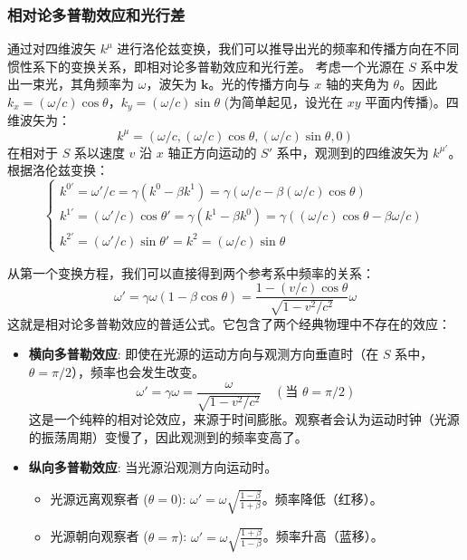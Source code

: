 \documentclass[fontset=none]{ctexart}
\begin{document}
\subsubsection{相对论多普勒效应和光行差}
通过对四维波矢 $k^{\mu}$ 进行洛伦兹变换，我们可以推导出光的频率和传播方向在不同惯性系下的变换关系，即相对论多普勒效应和光行差。
考虑一个光源在 $S$ 系中发出一束光，其角频率为 $\omega$，波矢为 $\bm{k}$。光的传播方向与 $x$ 轴的夹角为 $\theta$。因此 $k_x = (\omega/c)\cos\theta$，$k_y = (\omega/c)\sin\theta$ (为简单起见，设光在 $xy$ 平面内传播)。四维波矢为：
\begin{equation}
k^{\mu} = (\omega/c, (\omega/c)\cos\theta, (\omega/c)\sin\theta, 0)
\end{equation}
在相对于 $S$ 系以速度 $v$ 沿 $x$ 轴正方向运动的 $S'$ 系中，观测到的四维波矢为 $k^{\mu'}$。根据洛伦兹变换：
\begin{equation}
\begin{cases}
k^{0'} = \omega'/c = \gamma(k^0 - \beta k^1) = \gamma(\omega/c - \beta(\omega/c)\cos\theta) \\
k^{1'} = (\omega'/c)\cos\theta' = \gamma(k^1 - \beta k^0) = \gamma((\omega/c)\cos\theta - \beta\omega/c) \\
k^{2'} = (\omega'/c)\sin\theta' = k^2 = (\omega/c)\sin\theta
\end{cases}
\end{equation}

\begin{theorem}[相对论多普勒效应]
从第一个变换方程，我们可以直接得到两个参考系中频率的关系：
\begin{equation}
\omega' = \gamma\omega(1 - \beta\cos\theta) = \frac{1 - (v/c)\cos\theta}{\sqrt{1 - v^2/c^2}}\omega
\end{equation}
这就是相对论多普勒效应的普适公式。它包含了两个经典物理中不存在的效应：
\begin{itemize}
    \item \textbf{横向多普勒效应}: 即使在光源的运动方向与观测方向垂直时（在 $S$ 系中，$\theta=\pi/2$），频率也会发生改变。
    \begin{equation}
    \omega' = \gamma\omega = \frac{\omega}{\sqrt{1 - v^2/c^2}} \quad (\text{当 } \theta = \pi/2)
    \end{equation}
    这是一个纯粹的相对论效应，来源于时间膨胀。观察者会认为运动时钟（光源的振荡周期）变慢了，因此观测到的频率变高了。
    \item \textbf{纵向多普勒效应}: 当光源沿观测方向运动时。
    \begin{itemize}
        \item 光源远离观察者 ($\theta = 0$): $\omega' = \omega\sqrt{\frac{1-\beta}{1+\beta}}$。频率降低（红移）。
        \item 光源朝向观察者 ($\theta = \pi$): $\omega' = \omega\sqrt{\frac{1+\beta}{1-\beta}}$。频率升高（蓝移）。
    \end{itemize}
\end{itemize}
\end{theorem}
\end{document}
